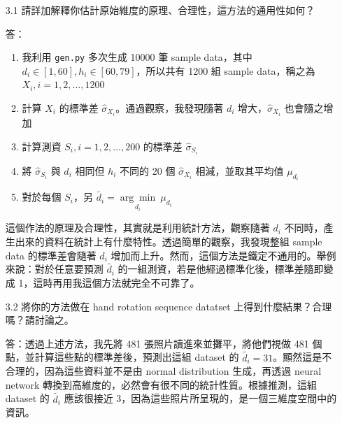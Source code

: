 \documentclass[12pt,a4paper]{extarticle}
\begin{document}
\begin{itemize}
  \item[3.1] 請詳加解釋你估計原始維度的原理、合理性，這方法的通用性如何？
  \par 答：
  \begin{enumerate}
    \item 我利用 \texttt{gen.py} 多次生成 10000 筆 sample data，其中 $d_i \in [1, 60], h_i \in [60, 79]$，所以共有 1200 組 sample data，稱之為 $X_i, i = 1, 2, \dots, 1200$
    \item 計算 $X_i$ 的標準差 $\hat{\sigma}_{X_i}$。通過觀察，我發現隨著 $d_i$ 增大，$\hat{\sigma}_{X_i}$ 也會隨之增加
    \item 計算測資 $S_i, i = 1, 2, \dots, 200$ 的標準差 $\hat{\sigma}_{S_i}$
    \item 將 $\hat{\sigma}_{S_i}$ 與 $d_i$ 相同但 $h_i$ 不同的 20 個 $\hat{\sigma}_{X_i}$ 相減，並取其平均值 $\mu_{d_i}$
    \item 對於每個 $S_i$，另 $\tilde{d_i} = \underset{d_i}{\arg\min}\ \mu_{d_i}$
  \end{enumerate}
  \par 這個作法的原理及合理性，其實就是利用統計方法，觀察隨著 $d_i$ 不同時，產生出來的資料在統計上有什麼特性。透過簡單的觀察，我發現整組 sample data 的標準差會隨著 $d_i$ 增加而上升。然而，這個方法是鐵定不通用的。舉例來說：對於任意要預測 $\tilde{d_i}$ 的一組測資，若是他經過標準化後，標準差隨即變成 1，這時再用我這個方法就完全不可靠了。

  \item[3.2] 將你的方法做在 hand rotation sequence datatset 上得到什麼結果？合理嗎？請討論之。
  \par 答：透過上述方法，我先將 481 張照片讀進來並攤平，將他們視做 481 個點，並計算這些點的標準差後，預測出這組 dataset 的 $\tilde{d_i} = 31$。顯然這是不合理的，因為這些資料並不是由 normal distribution 生成，再透過 neural network 轉換到高維度的，必然會有很不同的統計性質。根據推測，這組 dataset 的 $\tilde{d_i}$ 應該很接近 3，因為這些照片所呈現的，是一個三維度空間中的資訊。

\end{itemize}
\end{document}
